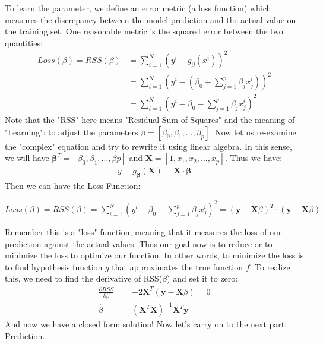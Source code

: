 \documentclass{article}
\begin{document}
To learn the parameter, we define an error metric (a loss function) which measures the discrepancy between the model prediction and the actual value on the training set. One reasonable metric is the squared error between the two quantities:
\begin{align*}
    Loss(\beta) = RSS(\beta) &= \sum_{i=1}^{N}(y^{i}-g_{\beta}(x^{i}))^{2}\\
    &= \sum_{i=1}^{N}(y^{i}-(\beta_{0} + \sum_{j=1}^{p}\beta_{j}x_{j}^{i}))^{2}\\
    &= \sum_{i=1}^{N}(y^{i}-\beta_{0} - \sum_{j=1}^{p}\beta_{j}x_{j}^{i})^{2}
\end{align*}
Note that the "RSS" here means "Residual Sum of Squares" and the meaning of "Learning": to adjust the parameters $\beta = [\beta_{0}, \beta_{1}, ..., \beta_{p}]$. Now let us re-examine the "complex" equation and try to rewrite it using linear algebra. In this sense, we will have $\bm{\beta}^{T} = [\beta_{0}, \beta_{1}, ..., \beta{p}]$ and $\mathbf{X} = [1, x_{1}, x_{2}, ..., x_{p}]$. Thus we have:
\begin{align*}
    y = g_{\bm{\beta}}(\mathbf{X}) = \mathbf{X}\cdot \bm{\beta}
\end{align*}
Then we can have the Loss Function:
\begin{tcolorbox}[colback=yellow!20, colframe=yellow!90, title=Loss Function, coltitle=black]
    $Loss(\beta) = RSS(\beta) = \sum_{i=1}^{N}(y^{i}-\beta_{0} - \sum_{j=1}^{p}\beta_{j}x_{j}^{i})^{2} = (\bm{y}-\bm{X}\beta)^{T} \cdot (\bm{y}-\bm{X}\beta)$
\end{tcolorbox}
Remember this is a "loss" function, meaning that it measures the loss of our prediction against the actual values. Thus our goal now is to reduce or to minimize the loss to optimize our function. In other words, to minimize the loss is to find hypothesis function $g$ that approximates the true function $f$. To realize this, we need to find the derivative of RSS($\beta$) and set it to zero:
\begin{align*}
    \frac{\partial RSS}{\partial \beta} &= -2\bm{X}^{T}(\bm{y}-\bm{X}\beta) = 0\\
    \hat{\beta} &= (\bm{X}^{T} \bm{X})^{-1}\bm{X}^{T}\bm{y}
\end{align*}
And now we have a closed form solution! Now let's carry on to the next part: Prediction.
\end{document}
